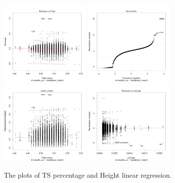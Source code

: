 \documentclass[11pt,letterpaper]{amsart}
\begin{document}
\begin{figure}[H] 
\includegraphics[width=0.4\textwidth]{lmplot1}\hspace{1cm}
\includegraphics[width=0.4\textwidth]{lmplot2}\hspace{1cm}
\includegraphics[width=0.4\textwidth]{lmplot3}\hspace{1cm}
\includegraphics[width=0.4\textwidth]{lmplot4}\hspace{1cm}
\caption{The plots of TS percentage and Height linear regression. \label{fig1}}
\end{figure} \leavevmode 
\end{document}
